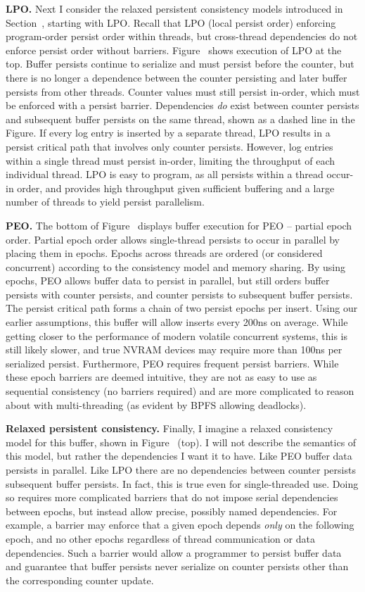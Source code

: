 \textbf{LPO.} Next I consider the relaxed persistent consistency models introduced in Section~, starting with LPO.
Recall that LPO (local persist order) enforcing program-order persist order within threads, but cross-thread dependencies do not enforce persist order without barriers.
Figure~ shows execution of LPO at the top.
Buffer persists continue to serialize and must persist before the counter, but there is no longer a dependence between the counter persisting and later buffer persists from other threads.
Counter values must still persist in-order, which must be enforced with a persist barrier.
Dependencies \emph{do} exist between counter persists and subsequent buffer persists on the same thread, shown as a dashed line in the Figure.
If every log entry is inserted by a separate thread, LPO results in a persist critical path that involves only counter persists.
However, log entries within a single thread must persist in-order, limiting the throughput of each individual thread.
LPO is easy to program, as all persists within a thread occur-in order, and provides high throughput given sufficient buffering and a large number of threads to yield persist parallelism.

\textbf{PEO.} The bottom of Figure~ displays buffer execution for PEO -- partial epoch order.
Partial epoch order allows single-thread persists to occur in parallel by placing them in epochs.
Epochs across threads are ordered (or considered concurrent) according to the consistency model and memory sharing.
By using epochs, PEO allows buffer data to persist in parallel, but still orders buffer persists with counter persists, and counter persists to subsequent buffer persists.
The persist critical path forms a chain of two persist epochs per insert.
Using our earlier assumptions, this buffer will allow inserts every 200ns on average.
While getting closer to the performance of modern volatile concurrent systems, this is still likely slower, and true NVRAM devices may require more than 100ns per serialized persist.
Furthermore, PEO requires frequent persist barriers.
While these epoch barriers are deemed intuitive, they are not as easy to use as sequential consistency (no barriers required) and are more complicated to reason about with multi-threading (as evident by BPFS allowing deadlocks).

\textbf{Relaxed persistent consistency.}
Finally, I imagine a relaxed consistency model for this buffer, shown in Figure~ (top).
I will not describe the semantics of this model, but rather the dependencies I want it to have.
Like PEO buffer data persists in parallel.
Like LPO there are no dependencies between counter persists subsequent buffer persists.
In fact, this is true even for single-threaded use.
Doing so requires more complicated barriers that do not impose serial dependencies between epochs, but instead allow precise, possibly named dependencies.
For example, a barrier may enforce that a given epoch depends \emph{only} on the following epoch, and no other epochs regardless of thread communication or data dependencies.
Such a barrier would allow a programmer to persist buffer data and guarantee that buffer persists never serialize on counter persists other than the corresponding counter update.

